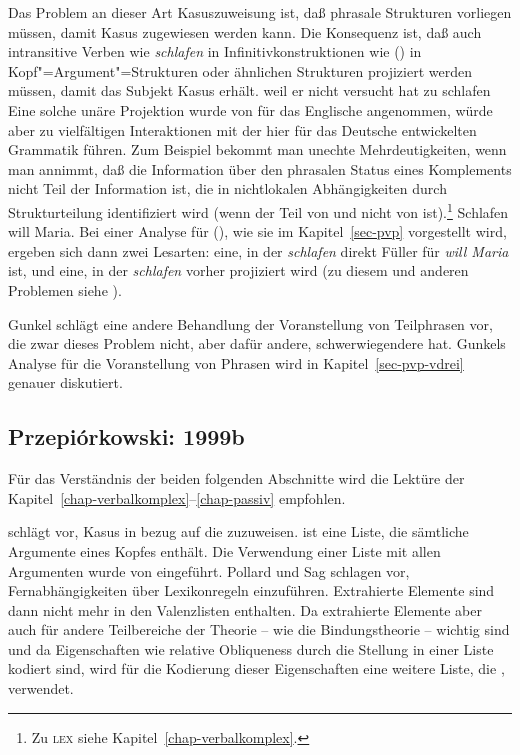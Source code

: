 \noindent
Das Problem an dieser Art Kasuszuweisung ist, daß phrasale Strukturen vorliegen müssen,
damit Kasus zugewiesen werden kann. Die Konsequenz ist, daß auch intransitive Verben wie \emph{schlafen}
in Infinitivkonstruktionen wie () in Kopf"=Argument"=Strukturen oder ähnlichen Strukturen
projiziert werden müssen, damit das Subjekt Kasus erhält.
\ea
weil er nicht versucht hat zu schlafen
\z
Eine solche unäre Projektion wurde von \citet*[, Fn. 32]{ps2} für das Englische
angenommen, würde aber zu vielfältigen Interaktionen mit der hier für das Deutsche
entwickelten Grammatik führen. Zum Beispiel bekommt man unechte Mehrdeutigkeiten,
wenn man annimmt, daß die Information über den phrasalen Status eines Komplements 
nicht Teil der Information ist, die in nichtlokalen Abhängigkeiten durch Strukturteilung
identifiziert wird (wenn der \lexw{} Teil von \synsem und nicht von \HPSGloc ist).\footnote{
  Zu \textsc{lex} siehe Kapitel~\ref{chap-verbalkomplex}.%
}
\ea
Schlafen will Maria.
\z
Bei einer Analyse für (), wie sie im Kapitel~\ref{sec-pvp} vorgestellt wird, ergeben
sich dann zwei Lesarten: eine, in der \emph{schlafen} direkt Füller für \emph{will Maria}
ist, und eine, in der \emph{schlafen} vorher projiziert wird (zu diesem und anderen Problemen siehe
).

Gunkel schlägt eine andere Behandlung der Voranstellung von Teilphrasen vor, die
zwar dieses Problem nicht, aber dafür andere, schwerwiegendere hat. Gunkels Analyse
für die Voranstellung von Phrasen wird in Kapitel~\ref{sec-pvp-vdrei} genauer diskutiert.






\subsection{Przepi{\'o}rkowski: 1999b}
\label{kasus-adamp}

Für das Verständnis der beiden folgenden Abschnitte wird die Lektüre
der Kapitel~\ref{chap-verbalkomplex}--\ref{chap-passiv} empfohlen.

\citet{Prze99} schlägt vor, Kasus in bezug auf die \argstl zuzuweisen. \argst{} ist eine
Liste, die sämtliche Argumente eines Kopfes enthält. Die Verwendung einer
Liste mit allen Argumenten wurde von \citet[Kapitel~9]{ps2} eingeführt. Pollard
und Sag schlagen vor, Fernabhängigkeiten über Lexikonregeln einzuführen.
Extrahierte Elemente sind dann nicht mehr in den Valenzlisten enthalten.
Da extrahierte Elemente aber auch für andere Teilbereiche der Theorie -- wie \zb
die Bindungstheorie -- wichtig sind und da Eigenschaften wie
relative Obliqueness durch die Stellung in einer Liste kodiert sind, wird für die
Kodierung dieser Eigenschaften eine weitere Liste, die \argstl, verwendet.

